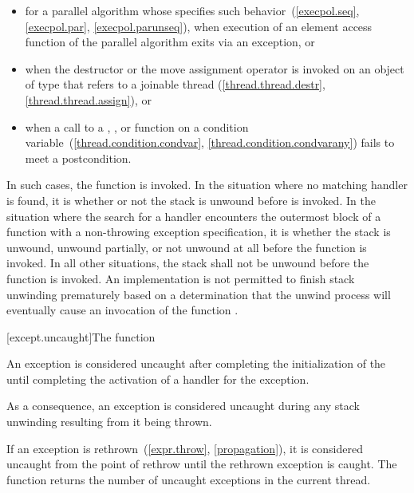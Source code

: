 \begin{note}
\begin{itemize}
\item%
for a parallel algorithm whose  specifies such
behavior~(\ref{execpol.seq}, \ref{execpol.par}, \ref{execpol.parunseq}),
when execution of an element access function
of the parallel algorithm exits via an exception, or

\item%
when the destructor or the move assignment operator is invoked on an object
of type  that refers to a joinable thread
(\ref{thread.thread.destr}, \ref{thread.thread.assign}), or

\item%
when a call to a , , or 
function on a condition variable~(\ref{thread.condition.condvar}, \ref{thread.condition.condvarany})
fails to meet a postcondition.
\end{itemize}
\end{note}

\pnum
{}%
In such cases,
the function  is invoked.
In the situation where no matching handler is found, it is
whether or not the stack is unwound
before  is invoked.
In the situation where the search for a handler encounters the
outermost block of a function
with a non-throwing exception specification, it is
whether the stack is unwound, unwound partially, or not unwound at all
before the function  is invoked.
In all other situations, the stack shall not be unwound before
the function 
is invoked.
An implementation is not permitted to finish stack unwinding
prematurely based on a determination that the unwind process
will eventually cause an invocation of the function
.

[except.uncaught]{The  function}%

\pnum
An exception is considered uncaught
after completing the initialization of the 
until completing the activation of a handler for the exception.
\begin{note}
As a consequence, an exception is considered uncaught
during any stack unwinding resulting from it being thrown.
\end{note}
If an exception is rethrown~(\ref{expr.throw}, \ref{propagation}),
it is considered uncaught from the point of rethrow
until the rethrown exception is caught.
The function 
returns the number of uncaught exceptions in the current thread.%
